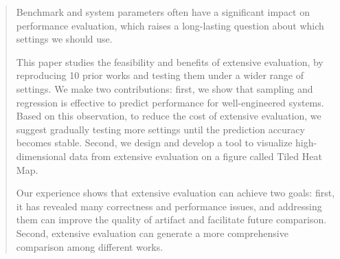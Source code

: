 \begin{abstract}
Benchmark and system parameters often have a significant impact
on performance evaluation, which raises
a long-lasting question about which settings we should use.

This paper studies the feasibility and benefits of extensive
evaluation, by reproducing 10 prior works and testing them under
a wider range of settings. We make two contributions: first, we
show that sampling and regression is effective to predict performance
for well-engineered systems. Based on this observation, to reduce the cost
of extensive evaluation, we suggest gradually testing more settings until the
prediction accuracy becomes stable. Second, we design and develop a tool to
visualize high-dimensional data from extensive evaluation on a figure called Tiled Heat Map.

Our experience shows that extensive evaluation can achieve two goals:
first, it has revealed many correctness and performance issues, and
addressing them can improve the quality of artifact and facilitate future
comparison. Second, extensive evaluation can generate a more comprehensive
comparison among different works.


\end{abstract}